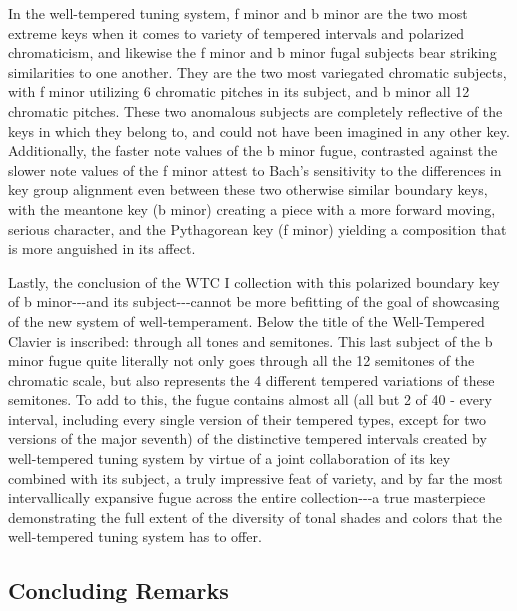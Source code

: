 In the well-tempered tuning system, f minor and b minor are the two most
extreme keys when it comes to variety of tempered intervals and
polarized chromaticism, and likewise the f minor and b minor fugal
subjects bear striking similarities to one another. They are the two
most variegated chromatic subjects, with f minor utilizing 6 chromatic
pitches in its subject, and b minor all 12 chromatic pitches. These two
anomalous subjects are completely reflective of the keys in which they
belong to, and could not have been imagined in any other key.
Additionally, the faster note values of the b minor fugue, contrasted
against the slower note values of the f minor attest to Bach's
sensitivity to the differences in key group alignment even between these
two otherwise similar boundary keys, with the meantone key (b minor)
creating a piece with a more forward moving, serious character, and the
Pythagorean key (f minor) yielding a composition that is more anguished
in its affect.

Lastly, the conclusion of the WTC I collection with this polarized
boundary key of b minor-\/-\/-and its subject-\/-\/-cannot be more
befitting of the goal of showcasing of the new system of
well-temperament. Below the title of the Well-Tempered Clavier is
inscribed: through all tones and semitones. This last subject of the b
minor fugue quite literally not only goes through all the 12 semitones
of the chromatic scale, but also represents the 4 different tempered
variations of these semitones. To add to this, the fugue contains almost
all (all but 2 of 40 - every interval, including every single version of
their tempered types, except for two versions of the major seventh) of
the distinctive tempered intervals created by well-tempered tuning
system by virtue of a joint collaboration of its key combined with its
subject, a truly impressive feat of variety, and by far the most
intervallically expansive fugue across the entire collection-\/-\/-a
true masterpiece demonstrating the full extent of the diversity of tonal
shades and colors that the well-tempered tuning system has to offer.



    \begin{center}
    \end{center}
    
    \subsection{Concluding Remarks}\label{concluding-remarks}

